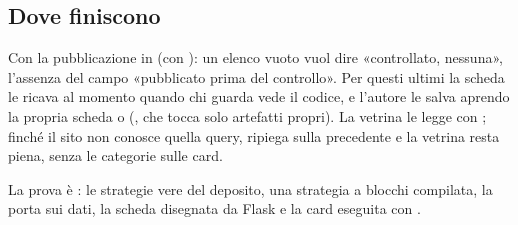 \subsection{Dove finiscono}

Con la pubblicazione in  (con ):
un elenco vuoto vuol dire «controllato, nessuna», l'assenza del campo
«pubblicato prima del controllo». Per questi ultimi la scheda le ricava al
momento quando chi guarda vede il codice, e l'autore le salva aprendo la
propria scheda o  (,
che tocca solo artefatti propri). La vetrina le legge con
; finché il sito non conosce quella query,
 ripiega sulla precedente e la vetrina
resta piena, senza le categorie sulle card.

\noindent
La prova è : le strategie vere del
deposito, una strategia a blocchi compilata, la porta sui dati, la scheda
disegnata da Flask e la card eseguita con .
